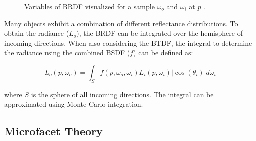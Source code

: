 \begin{figure}[H]
  \centering
  \caption{Variables of \gls{BRDF} visualized for a sample $\omega_o$ and $\omega_i$ at $p$ \cite{Pharr_Physically_Based_Rendering_2023}.}
  \label{fig:brdf-visualized}
\end{figure}

Many objects exhibit a combination of different reflectance distributions. To obtain the radiance ($L_o$), the \gls{BRDF} can be integrated over the hemisphere of incoming directions. When also considering the \gls{BTDF}, the integral to determine the radiance using the combined \gls{BSDF} ($f$) can be defined as:

\begin{equation}
  L_o(p, \omega_o) = \int_{S} f(p, \omega_o, \omega_i) L_i(p, \omega_i) |\cos(\theta_i)| d\omega_i
\end{equation}

where $S$ is the sphere of all incoming directions. The integral can be approximated using Monte Carlo integration. \cite{Pharr_Physically_Based_Rendering_2023}

\subsection*{Microfacet Theory}

